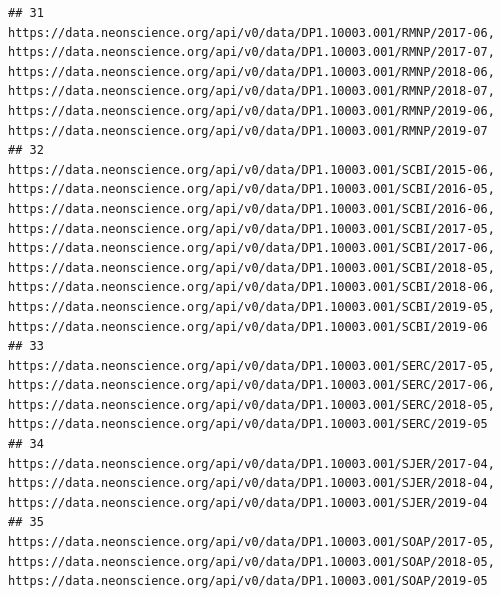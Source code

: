 \documentclass[]{book}
\begin{document}
\begin{verbatim}
## 31                                                                                                                                                                                                                https://data.neonscience.org/api/v0/data/DP1.10003.001/RMNP/2017-06, https://data.neonscience.org/api/v0/data/DP1.10003.001/RMNP/2017-07, https://data.neonscience.org/api/v0/data/DP1.10003.001/RMNP/2018-06, https://data.neonscience.org/api/v0/data/DP1.10003.001/RMNP/2018-07, https://data.neonscience.org/api/v0/data/DP1.10003.001/RMNP/2019-06, https://data.neonscience.org/api/v0/data/DP1.10003.001/RMNP/2019-07
## 32 https://data.neonscience.org/api/v0/data/DP1.10003.001/SCBI/2015-06, https://data.neonscience.org/api/v0/data/DP1.10003.001/SCBI/2016-05, https://data.neonscience.org/api/v0/data/DP1.10003.001/SCBI/2016-06, https://data.neonscience.org/api/v0/data/DP1.10003.001/SCBI/2017-05, https://data.neonscience.org/api/v0/data/DP1.10003.001/SCBI/2017-06, https://data.neonscience.org/api/v0/data/DP1.10003.001/SCBI/2018-05, https://data.neonscience.org/api/v0/data/DP1.10003.001/SCBI/2018-06, https://data.neonscience.org/api/v0/data/DP1.10003.001/SCBI/2019-05, https://data.neonscience.org/api/v0/data/DP1.10003.001/SCBI/2019-06
## 33                                                                                                                                                                                                                                                                                                                                                          https://data.neonscience.org/api/v0/data/DP1.10003.001/SERC/2017-05, https://data.neonscience.org/api/v0/data/DP1.10003.001/SERC/2017-06, https://data.neonscience.org/api/v0/data/DP1.10003.001/SERC/2018-05, https://data.neonscience.org/api/v0/data/DP1.10003.001/SERC/2019-05
## 34                                                                                                                                                                                                                                                                                                                                                                                                                               https://data.neonscience.org/api/v0/data/DP1.10003.001/SJER/2017-04, https://data.neonscience.org/api/v0/data/DP1.10003.001/SJER/2018-04, https://data.neonscience.org/api/v0/data/DP1.10003.001/SJER/2019-04
## 35                                                                                                                                                                                                                                                                                                                                                                                                                               https://data.neonscience.org/api/v0/data/DP1.10003.001/SOAP/2017-05, https://data.neonscience.org/api/v0/data/DP1.10003.001/SOAP/2018-05, https://data.neonscience.org/api/v0/data/DP1.10003.001/SOAP/2019-05

\end{verbatim}
\end{document}
